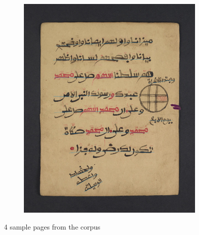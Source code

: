 \begin{figure}[]
\begin{subfigure}[b]{.475\columnwidth}
		\includegraphics[width=\textwidth]{kufic.jpg}
	\end{subfigure}
	\caption{4 sample pages from the corpus}
	\label{fig:samples}
\end{figure}


